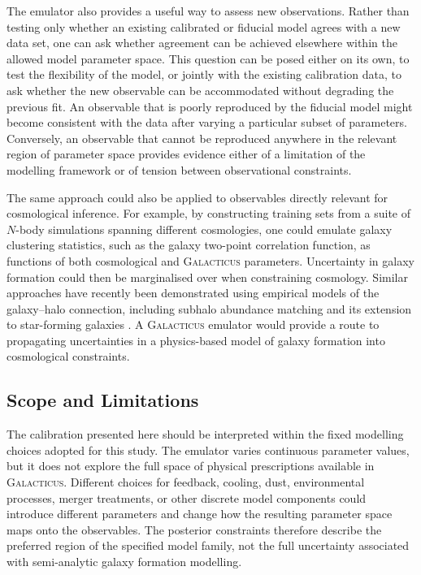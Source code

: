 \documentclass[twocolumn, apj, numberedappendix, iop]{openjournal}
\newcommand{\galacticus}{\textsc{Galacticus}\xspace}
\begin{document}
The emulator also provides a useful way to assess new observations. Rather than
testing only whether an existing calibrated or fiducial model agrees with a new
data set, one can ask whether agreement can be achieved elsewhere within the
allowed model parameter space. This question can be posed either on its own, to
test the flexibility of the model, or jointly with the existing calibration data,
to ask whether the new observable can be accommodated without degrading the
previous fit. An observable that is poorly reproduced by the fiducial model might
become consistent with the data after varying a particular subset of parameters.
Conversely, an observable that cannot be reproduced anywhere in the relevant
region of parameter space provides evidence either of a limitation of the
modelling framework or of tension between observational constraints.

The same approach could also be applied to observables directly relevant for cosmological inference. For example, by constructing training sets from a suite of $N$-body simulations spanning different cosmologies, one could emulate galaxy clustering statistics, such as the galaxy two-point correlation function, as functions of both cosmological and \galacticus{} parameters. Uncertainty in galaxy formation could then be marginalised over when constraining cosmology. Similar approaches have recently been demonstrated using empirical models of the galaxy–halo connection, including subhalo abundance matching and its extension to star-forming galaxies \citep{2026MNRAS.545f2143M,2026arXiv260419449O}. A \galacticus{} emulator would provide a route to propagating uncertainties in a physics-based model of galaxy formation into cosmological constraints.


\subsection{Scope and Limitations}

The calibration presented here should be interpreted within the fixed
modelling choices adopted for this study. The emulator varies continuous
parameter values, but it does not explore the full space of physical
prescriptions available in \galacticus{}. Different choices for feedback,
cooling, dust, environmental processes, merger treatments, or other discrete
model components could introduce different parameters and change how the
resulting parameter space maps onto the observables. The posterior constraints
therefore describe the preferred region of the specified model family, not the
full uncertainty associated with semi-analytic galaxy formation modelling.
\end{document}
